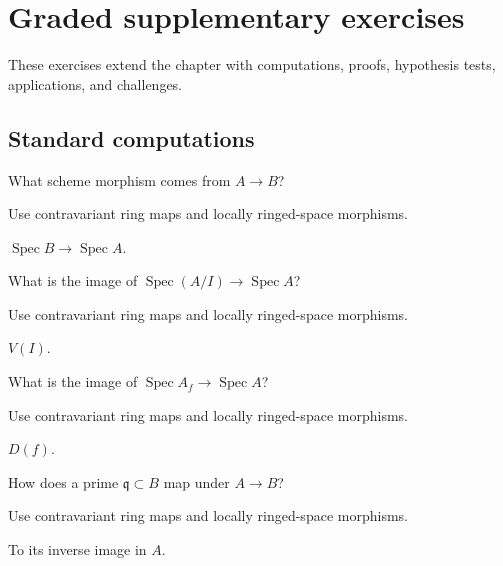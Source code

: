 \section{Graded supplementary exercises}
These exercises extend the chapter with computations, proofs, hypothesis tests, applications, and challenges.

\subsection*{Standard computations}

\begin{exercise}[Direction]\label{exr:vi19-expand-01}
What scheme morphism comes from $A\to B$?
\end{exercise}
\begin{hint}
Use contravariant ring maps and locally ringed-space morphisms.
\end{hint}
\begin{solution}
$\operatorname{Spec}B\to\operatorname{Spec}A$.
\end{solution}

\begin{exercise}[Quotient]\label{exr:vi19-expand-02}
What is the image of $\operatorname{Spec}(A/I)\to\operatorname{Spec}A$?
\end{exercise}
\begin{hint}
Use contravariant ring maps and locally ringed-space morphisms.
\end{hint}
\begin{solution}
$V(I)$.
\end{solution}

\begin{exercise}[Localization]\label{exr:vi19-expand-03}
What is the image of $\operatorname{Spec}A_f\to\operatorname{Spec}A$?
\end{exercise}
\begin{hint}
Use contravariant ring maps and locally ringed-space morphisms.
\end{hint}
\begin{solution}
$D(f)$.
\end{solution}

\begin{exercise}\label{exr:vi19-expand-04}
How does a prime $\mathfrak q\subset B$ map under $A\to B$?
\end{exercise}
\begin{hint}
Use contravariant ring maps and locally ringed-space morphisms.
\end{hint}
\begin{solution}
To its inverse image in $A$.
\end{solution}


